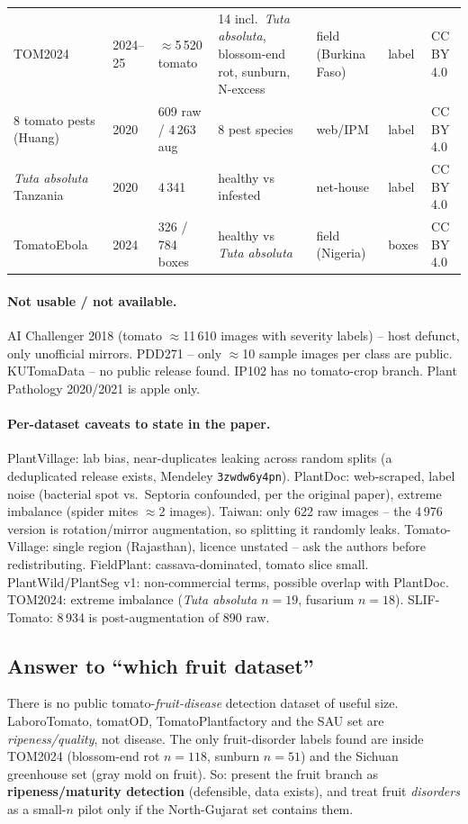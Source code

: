 \begin{longtable}{@{}L{3.0cm}L{1.0cm}L{1.6cm}L{3.0cm}L{1.5cm}L{1.7cm}L{2.4cm}@{}}
TOM2024~\cite{tom2024} & 2024--25 & $\approx$5\,520 tomato & 14 incl.\ \emph{Tuta absoluta}, blossom-end rot, sunburn, N-excess & field (Burkina Faso) & label & CC BY 4.0 \\
8 tomato pests (Huang) & 2020 & 609 raw / 4\,263 aug & 8 pest species & web/IPM & label & CC BY 4.0 \\
\emph{Tuta absoluta} Tanzania & 2020 & 4\,341 & healthy vs infested & net-house & label & CC BY 4.0 \\
TomatoEbola~\cite{tomatoebola} & 2024 & 326 / 784 boxes & healthy vs \emph{Tuta absoluta} & field (Nigeria) & boxes & CC BY 4.0 \\
\end{longtable}

\paragraph{Not usable / not available.} AI Challenger 2018 (tomato $\approx$11\,610 images with severity labels) -- host defunct, only unofficial mirrors. PDD271 -- only $\approx$10 sample images per class are public. KUTomaData -- no public release found. IP102 has no tomato-crop branch. Plant Pathology 2020/2021 is apple only.

\paragraph{Per-dataset caveats to state in the paper.}
PlantVillage: lab bias, near-duplicates leaking across random splits (a deduplicated release exists, Mendeley \texttt{3zwdw6y4pn}). PlantDoc: web-scraped, label noise (bacterial spot vs.\ Septoria confounded, per the original paper), extreme imbalance (spider mites $\approx$2 images). Taiwan: only 622 raw images -- the 4\,976 version is rotation/mirror augmentation, so splitting it randomly leaks. Tomato-Village: single region (Rajasthan), licence unstated -- ask the authors before redistributing. FieldPlant: cassava-dominated, tomato slice small. PlantWild/PlantSeg v1: non-commercial terms, possible overlap with PlantDoc. TOM2024: extreme imbalance (\emph{Tuta absoluta} $n{=}19$, fusarium $n{=}18$). SLIF-Tomato: 8\,934 is post-augmentation of 890 raw.

\subsection{Answer to ``which fruit dataset''}
There is no public tomato-\emph{fruit-disease} detection dataset of useful size. LaboroTomato, tomatOD, TomatoPlantfactory and the SAU set are \emph{ripeness/quality}, not disease. The only fruit-disorder labels found are inside TOM2024 (blossom-end rot $n{=}118$, sunburn $n{=}51$) and the Sichuan greenhouse set (gray mold on fruit). So: present the fruit branch as \textbf{ripeness/maturity detection} (defensible, data exists), and treat fruit \emph{disorders} as a small-$n$ pilot only if the North-Gujarat set contains them.
